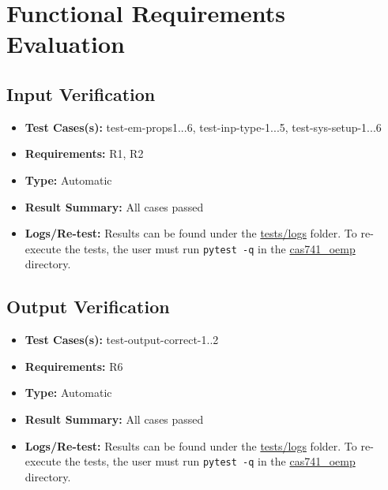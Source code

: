 \documentclass[12pt, titlepage]{article}
\begin{document}
\section{Functional Requirements Evaluation} \label{fr_ev}
\subsection{Input Verification}
\begin{itemize}
  \item \textbf{Test Cases(s):} test-em-props1...6, test-inp-type-1...5, test-sys-setup-1...6
  \item \textbf{Requirements:} R1, R2
  \item \textbf{Type:} Automatic
  \item \textbf{Result Summary:} All cases passed
  \item \textbf{Logs/Re-test:} Results can be found under the \href{https://github.com/husseinsd1/optimal-em-arrangement/tree/main/cas741-oemp/cas741_oemp/tests/logs}{tests/logs} folder. To re-execute the tests, the user must run \texttt{pytest -q} in the \href{https://github.com/husseinsd1/optimal-em-arrangement/tree/main/cas741-oemp/cas741_oemp}{cas741\_oemp} directory.
\end{itemize}

\subsection{Output Verification}
\begin{itemize}
  \item \textbf{Test Cases(s):} test-output-correct-1..2
  \item \textbf{Requirements:} R6
  \item \textbf{Type:} Automatic
  \item \textbf{Result Summary:} All cases passed
  \item \textbf{Logs/Re-test:} Results can be found under the \href{https://github.com/husseinsd1/optimal-em-arrangement/tree/main/cas741-oemp/cas741_oemp/tests/logs}{tests/logs} folder. To re-execute the tests, the user must run \texttt{pytest -q} in the \href{https://github.com/husseinsd1/optimal-em-arrangement/tree/main/cas741-oemp/cas741_oemp}{cas741\_oemp} directory.
\end{itemize}
\end{document}

